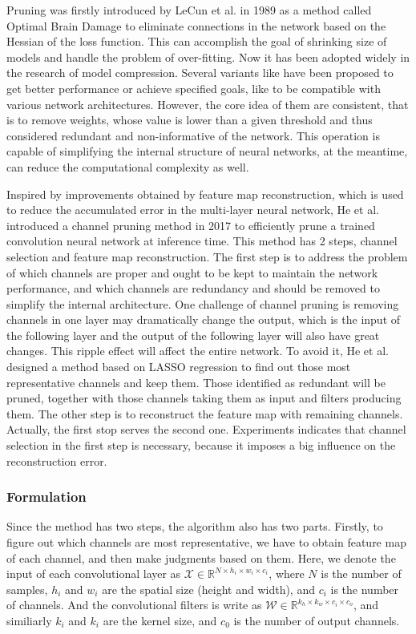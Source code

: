 \documentclass[sigconf]{acmart}
\begin{document}
Pruning was firstly introduced by LeCun et al. in 1989 as a method called Optimal Brain Damage\cite{optimal-brain-damage} to eliminate connections in the network based on the Hessian of the loss function. This can accomplish the goal of shrinking size of models and handle the problem of over-fitting. Now it has been adopted widely in the research of model compression. Several variants like \cite{channel-pruning}\cite{pruning-filters}\cite{dis-channle-pruning} have been proposed to get better performance or achieve specified goals, like to be compatible with various network architectures. However, the core idea of them are consistent, that is to remove weights, whose value is lower than a given threshold and thus considered redundant and non-informative of the network. This operation is capable of simplifying the internal structure of neural networks, at the meantime, can reduce the computational complexity as well.

Inspired by improvements obtained by feature map reconstruction\cite{accelerating-deep-cnn}, which is used to reduce the accumulated error in the multi-layer neural network, He et al. introduced a channel pruning method in 2017 \cite{channel-pruning} to efficiently prune a trained convolution neural network at inference time. This method has 2 steps, channel selection and feature map reconstruction. The first step is to address the problem of which channels are proper and ought to be kept to maintain the network performance, and which channels are redundancy and should be removed to simplify the internal architecture. One challenge of channel pruning is removing channels in one layer may dramatically change the output, which is the input of the following layer and the output of the following layer will also have great changes. This ripple effect will affect the entire network. To avoid it, He et al. designed a method based on LASSO regression to find out those most representative channels and keep them. Those identified as redundant will be pruned, together with those channels taking them as input and filters producing them. The other step is to reconstruct the feature map with remaining channels. Actually, the first stop serves the second one. Experiments indicates that channel selection in the first step is necessary, because it imposes a big influence on the reconstruction error.

\subsubsection{Formulation}
Since the method has two steps, the algorithm also has two parts. Firstly, to figure out which channels are most representative, we have to obtain feature map of each channel, and then make judgments based on them. Here, we denote the input of each convolutional layer as $\mathcal{X} \in \mathbb{R}^{N \times h_{i} \times w_{i} \times c_{i}}$, where $N$ is the number of samples, $h_{i}$ and $w_{i}$ are the spatial size (height and width), and $c_{i}$ is the number of channels. And the convolutional filters is write as $\mathcal{W} \in \mathbb{R}^{k_{h} \times k_{w} \times c_{i} \times c_{o}}$, and similiarly $k_{i}$ and $k_{i}$ are the kernel size, and $c_{0}$ is the number of output channels.
\end{document}
